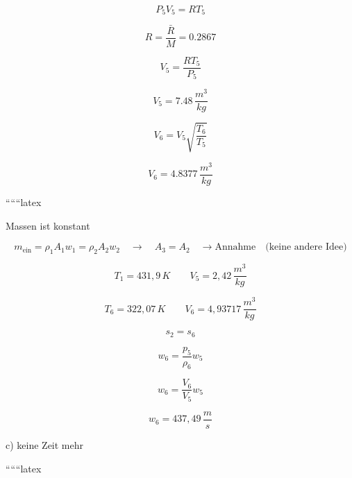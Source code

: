 \[
P_5 V_5 = R T_5
\]

\[
R = \frac{\bar{R}}{M} = 0.2867
\]

\[
V_5 = \frac{R T_5}{P_5}
\]

\[
V_5 = 7.48 \, \frac{m^3}{kg}
\]

\[
V_6 = V_5 \sqrt{\frac{T_6}{T_5}}
\]

\[
V_6 = 4.8377 \, \frac{m^3}{kg}
\]

``````latex


Massen ist konstant

\begin{equation}
m_{\text{ein}} = \rho_1 A_1 w_1 = \rho_2 A_2 w_2 \quad \rightarrow \quad A_3 = A_2 \quad \rightarrow \text{Annahme} \quad \text{(keine andere Idee)}
\end{equation}

\begin{equation}
T_1 = 431,9 \, K \quad \quad V_5 = 2,42 \, \frac{m^3}{kg}
\end{equation}

\begin{equation}
T_6 = 322,07 \, K \quad \quad V_6 = 4,93717 \, \frac{m^3}{kg}
\end{equation}

\begin{equation}
s_2 = s_6
\end{equation}

\begin{equation}
w_6 = \frac{p_5}{\rho_6} w_5
\end{equation}

\begin{equation}
w_6 = \frac{V_6}{V_5} w_5
\end{equation}

\begin{equation}
w_6 = 437,49 \, \frac{m}{s}
\end{equation}

c) keine Zeit mehr

``````latex



